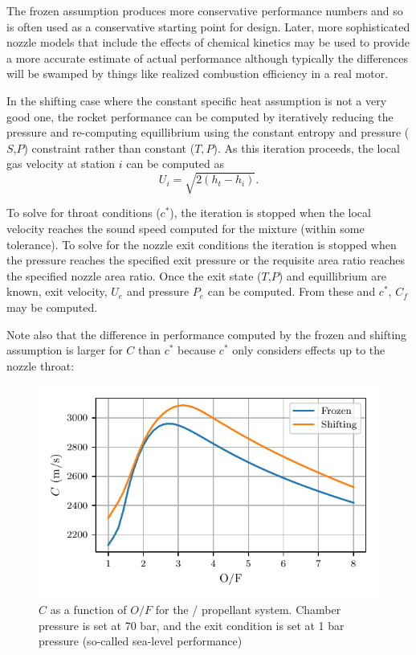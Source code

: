 \documentclass[twocolumn]{memoir} %
\begin{document}
The frozen assumption produces more conservative performance numbers and so is often used
as a conservative starting point for design.  Later, more sophisticated nozzle models that
include the effects of chemical kinetics may be used to provide a more accurate estimate 
of actual performance although typically the differences will be swamped by things like
realized combustion efficiency in a real motor.

In the shifting case where the constant specific heat assumption is not a very good one,
the rocket performance can be computed by iteratively reducing the pressure and re-computing equillibrium using
the constant entropy and pressure ($S$,$P$) constraint rather than constant ($T,P$).   As 
this iteration proceeds, the local gas velocity at station $i$ can be computed as
\begin{equation}
    U_i = \sqrt{2(h_t - h_i)}.
\end{equation}

To solve for throat conditions ($c^*$), the iteration is stopped when the local velocity
reaches the sound speed computed for the mixture (within some tolerance).  To solve for 
the nozzle exit conditions the iteration is stopped when the pressure reaches the specified
exit pressure or the requisite area ratio reaches the specified nozzle area ratio.  Once
the exit state ($T$,$P$) and equillibrium are known, exit velocity, $U_e$ and pressure $P_e$
can be computed.  From these and $c^*$, $C_f$ may be computed.

Note also that the difference in performance computed by the frozen and shifting assumption
is larger for $C$ than $c^*$ because $c^*$ only considers effects up to the nozzle
throat:

\begin{figure}[H]
    \includegraphics[width=\columnwidth]{C_ppp}
    \caption{$C$ as a function of $O/F$ for the  /  propellant system.  
    Chamber pressure is set at 70 bar, and the exit condition is set at 1 bar pressure
    (so-called sea-level performance)}
\end{figure}
\end{document}
